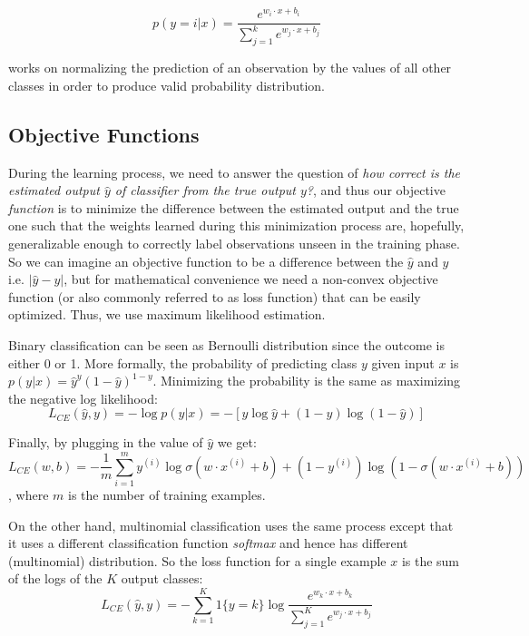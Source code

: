 $$p ( y = i | x ) = \frac { e ^ { w _ { i } \cdot x + b _ { i } } } { \sum _ { j = 1 } ^ { k } e ^ { w _ { j } \cdot x + b _ { j } } }$$

works on normalizing the prediction of an observation by the values of all other classes in order to produce valid probability distribution. 

\subsection{Objective Functions}

During the learning process, we need to answer the question of \emph{how correct is the estimated output $\hat{y}$ of classifier from the true output $y$?}, and thus our objective \emph{function} is to minimize the difference between the estimated output and the true one such that the weights learned during this minimization process are, hopefully,  generalizable enough to correctly label observations unseen in the training phase. So we can imagine an objective function to be a difference between the $\hat{y}$ and $y$ i.e. $\left | \hat{y} - y \right |$, but for mathematical convenience we need a non-convex objective function (or also commonly referred to as loss function)  that can be easily optimized. Thus, we use maximum likelihood estimation. 

Binary classification can be seen as Bernoulli distribution since the outcome is either 0 or 1. More formally, the probability of predicting class $y$ given input $x$ is  $p ( y | x ) = \hat { y } ^ { y } ( 1 - \hat { y } ) ^ { 1 - y }$. Minimizing the probability is the same as maximizing the negative log likelihood:
 $$L _ { C E } ( \hat { y } , y ) = - \log p ( y | x ) = - [ y \log \hat { y } + ( 1 - y ) \log ( 1 - \hat { y } ) ]$$

Finally, by plugging in the value of $\hat{y}$ we get:
$$ L _ { C E } ( w , b ) = - \frac { 1 } { m } \sum _ { i = 1 } ^ { m } y ^ { ( i ) } \log \sigma \left( w \cdot x ^ { ( i ) } + b \right) + \left( 1 - y ^ { ( i ) } \right) \log \left( 1 - \sigma \left( w \cdot x ^ { ( i ) } + b \right) \right) $$, where $m$ is the number of training examples.

On the other hand, multinomial classification uses the same process except that it uses a different classification function \emph{softmax} and hence has different (multinomial) distribution. So the loss function for a single example $x$ is the sum of the logs of the $K$ output classes:
$$ L _ { C E } ( \hat { y } , y ) = - \sum _ { k = 1 } ^ { K } 1 \{ y = k \} \log \frac { e ^ { w _ { k } \cdot x + b _ { k } } } { \sum _ { j = 1 } ^ { K } e ^ { w _ { j } \cdot x + b _ { j } } } $$

